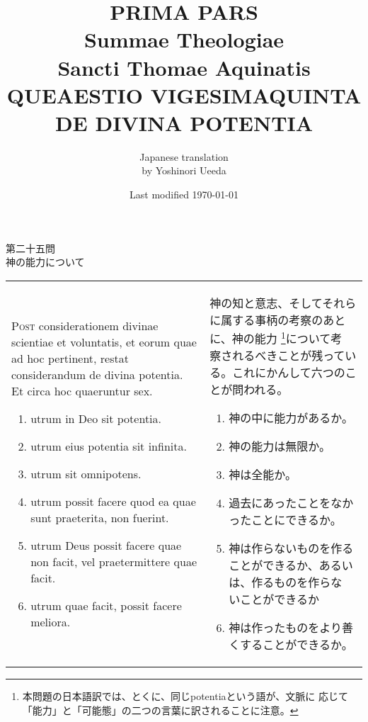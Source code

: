 \documentclass[10pt]{jsarticle} %
\title{{\bf PRIMA PARS}\\{\HUGE Summae Theologiae}\\Sancti Thomae
Aquinatis\\{\sffamily QUEAESTIO VIGESIMAQUINTA}\\DE DIVINA
POTENTIA}
\author{Japanese translation\\by Yoshinori {\sc Ueeda}}
\date{Last modified \today}
\begin{document}
\maketitle

\begin{center}
{\Large 第二十五問\\神の能力について}
\end{center}


\begin{longtable}{p{21em}p{21em}}

{\huge P}{\scshape ost} considerationem divinae scientiae et voluntatis,
et eorum quae ad hoc pertinent, restat considerandum de divina
potentia. Et circa hoc quaeruntur sex. 

\begin{enumerate}
 \item utrum in Deo sit potentia.
 \item utrum eius potentia sit infinita. 
 \item utrum sit omnipotens. 
 \item utrum possit facere quod ea quae sunt praeterita, non fuerint. 
 \item utrum Deus possit facere quae non facit, vel praetermittere quae
       facit. 
 \item utrum quae facit, possit facere meliora.
\end{enumerate}

&
神の知と意志、そしてそれらに属する事柄の考察のあとに、神の能力
 \footnote{本問題の日本語訳では、とくに、同じpotentiaという語が、文脈に
 応じて「能力」と「可能態」の二つの言葉に訳されることに注意。}について考
 察されるべきことが残っている。これにかんして六つのことが問われる。

\begin{enumerate}
 \item 神の中に能力があるか。
 \item 神の能力は無限か。
 \item 神は全能か。
 \item 過去にあったことをなかったことにできるか。
 \item 神は作らないものを作ることができるか、あるいは、作るものを作らな
       いことができるか
 \item 神は作ったものをより善くすることができるか。
\end{enumerate}

\end{longtable}

\newpage
\end{document}
